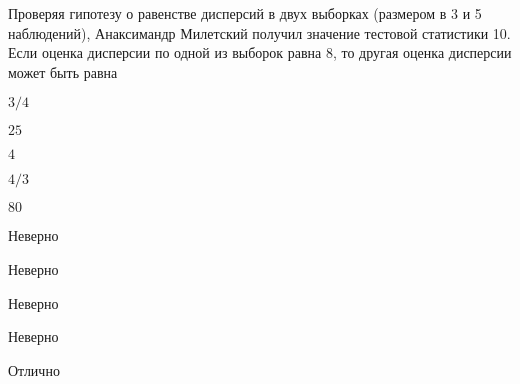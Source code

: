 
\begin{question}
Проверяя гипотезу о равенстве дисперсий в двух выборках (размером в 3 и
5 наблюдений), Анаксимандр Милетский получил значение тестовой
статистики 10. Если оценка дисперсии по одной из выборок равна 8, то
другая оценка дисперсии может быть равна
\begin{answerlist}
  \item \(3/4\)
  \item \(25\)
  \item \(4\)
  \item \(4/3\)
  \item \(80\)
\end{answerlist}
\end{question}

\begin{solution}
\begin{answerlist}
  \item Неверно
  \item Неверно
  \item Неверно
  \item Неверно
  \item Отлично
\end{answerlist}
\end{solution}

